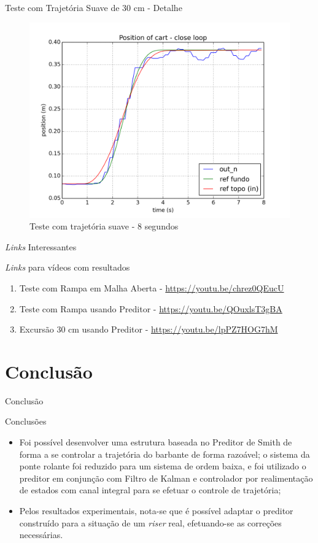 \documentclass[10pt]{beamer}
\begin{document}
\begin{frame}[fragile]{Teste com Trajetória Suave de 30 cm - Detalhe}
\begin{figure}[!ht]
\centering
\includegraphics[width=.8\linewidth]{figures/resultados/experimento/closed_loop_trajetoria_rafael_detalhe}
\caption{Teste com trajetória suave - 8 segundos}
\label{trajSuave8}
\end{figure}
\end{frame}

\begin{frame}[fragile]{\textit{Links} Interessantes}
\begin{block}{\textit{Links} para vídeos com resultados}
\begin{enumerate}
	\item Teste com Rampa em Malha Aberta - \url{https://youtu.be/chrez0QEucU}
	\item Teste com Rampa usando Preditor - \url{https://youtu.be/QOuxlsT3gBA}
	\item Excursão 30 cm usando Preditor - \url{https://youtu.be/lpPZ7HOG7hM}
\end{enumerate}
\end{block}
\end{frame}

\section{Conclusão}

\begin{frame}[fragile]{Conclusão}
\begin{block}{Conclusões}
\begin{itemize}
	\item Foi possível desenvolver uma estrutura baseada no Preditor de Smith de forma a se controlar a trajetória do barbante de forma razoável; o sistema da ponte rolante foi reduzido para um sistema de ordem baixa, e foi utilizado o preditor em conjunção com Filtro de Kalman e controlador por realimentação de estados com canal integral para se efetuar o controle de trajetória;
	\item Pelos resultados experimentais, nota-se que é possível adaptar o preditor construído para a situação de um \textit{riser} real, efetuando-se as correções necessárias.
\end{itemize}
\end{block}
\end{frame}
\end{document}
